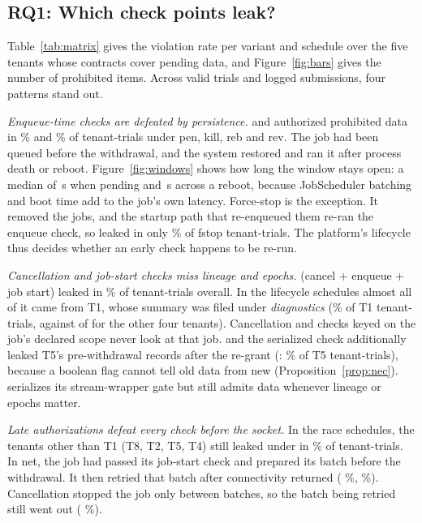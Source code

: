 \subsection{RQ1: Which check points leak?}
\label{sec:eval-matrix}




Table~\ref{tab:matrix} gives the violation rate per variant and schedule over the five tenants whose contracts cover pending
data, and Figure~\ref{fig:bars} gives the number of prohibited items. Across \nTrialsValid{} valid trials and
\nSubmissions{} logged submissions, four patterns stand out.

\emph{Enqueue-time checks are defeated by persistence.}  and  authorized prohibited data in
\noneLifePct{}\% and \enqueueLifePct{}\% of tenant-trials under \textsf{pen}, \textsf{kill}, \textsf{reb} and \textsf{rev}.
The job had been queued before the withdrawal, and the system restored and ran it after process death or reboot.
Figure~\ref{fig:windows} shows how long the window stays open: a median of \winPendingMed{}\,s when pending and
\winRebootMed{}\,s across a reboot, because JobScheduler batching and boot time add to the job's own latency. Force-stop is
the exception. It removed the jobs, and the startup path that re-enqueued them re-ran the enqueue check, so 
leaked in only \enqueueFstopPct{}\% of \textsf{fstop} tenant-trials. The platform's lifecycle thus decides whether an
early check happens to be re-run.

\emph{Cancellation and job-start checks miss lineage and epochs.}  (cancel + enqueue + job start) leaked in
\convViolPct{}\% of tenant-trials overall. In the lifecycle schedules almost all of it came from T1, whose summary was
filed under \textit{diagnostics} (\convTOneLifePct{}\% of T1 tenant-trials, against \convOtherLifeK{} of \convOtherLifeN{}
for the other four tenants). Cancellation and checks keyed on the job's declared
scope never look at that job.  and the serialized  check additionally leaked T5's
pre-withdrawal records after the re-grant (: \egressTFivePct{}\% of T5 tenant-trials), because a boolean
flag cannot tell old data from new (Proposition~\ref{prop:nec}).  serializes its stream-wrapper gate but still admits data
whenever lineage or epochs matter.

\emph{Late authorizations defeat every check before the socket.} In the race schedules, the tenants other than T1
(T8, T2, T5, T4) still leaked under  in \convRacePct{}\% of tenant-trials. In \textsf{net}, the job had
passed its job-start check and prepared its batch before the withdrawal. It then retried that batch after connectivity
returned ( \jobstartNetPct{}\%,  \convNetPct{}\%). Cancellation stopped the job only between
batches, so the batch being retried still went out ( \cancelNetPct{}\%).

